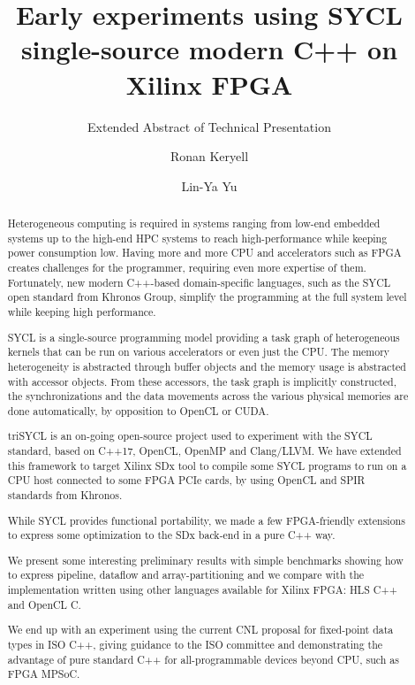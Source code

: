 \documentclass[sigplan, review, authordraft]{acmart}
\begin{document}
\title{Early experiments using SYCL single-source modern C++ on Xilinx FPGA}
\subtitle{Extended Abstract of Technical Presentation}

\author{Ronan Keryell}

\author{Lin-Ya Yu}



\begin{abstract}
  Heterogeneous computing is required in systems ranging from low-end
  embedded systems up to the high-end HPC systems to reach
  high-performance while keeping power consumption low. Having more
  and more CPU and accelerators such as FPGA creates challenges for
  the programmer, requiring even more expertise of them. Fortunately,
  new modern C++-based domain-specific languages, such as the SYCL
  open standard from Khronos Group, simplify the programming at the
  full system level while keeping high performance.

  SYCL is a single-source programming model providing a task graph of
  heterogeneous kernels that can be run on various accelerators or
  even just the CPU. The memory heterogeneity is abstracted through
  buffer objects and the memory usage is abstracted with accessor
  objects. From these accessors, the task graph is implicitly
  constructed, the synchronizations and the data movements across the
  various physical memories are done automatically, by opposition to
  OpenCL or CUDA.

  triSYCL is an on-going open-source project used to experiment with
  the SYCL standard, based on C++17, OpenCL, OpenMP and Clang/LLVM.
  We have extended this framework to target Xilinx SDx tool to compile
  some SYCL programs to run on a CPU host connected to some FPGA PCIe
  cards, by using OpenCL and SPIR standards from Khronos.

  While SYCL provides functional portability, we made a few
  FPGA-friendly extensions to express some optimization to the SDx
  back-end in a pure C++ way.

  We present some interesting preliminary results with simple
  benchmarks showing how to express pipeline, dataflow and
  array-partitioning and we compare with the implementation written
  using other languages available for Xilinx FPGA: HLS C++ and OpenCL
  C.

  We end up with an experiment using the current CNL proposal for
  fixed-point data types in ISO C++, giving guidance to the ISO
  committee and demonstrating the advantage of pure standard C++ for
  all-programmable devices beyond CPU, such as FPGA MPSoC.
\end{abstract}
\end{document}
